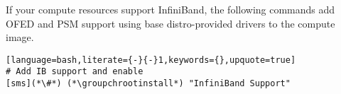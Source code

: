 If your compute resources support InfiniBand, the following commands add OFED
and PSM support using base distro-provided drivers to the compute
image. 

\begin{lstlisting}[language=bash,literate={-}{-}1,keywords={},upquote=true]
# Add IB support and enable
[sms](*\#*) (*\groupchrootinstall*) "InfiniBand Support"
\end{lstlisting}

